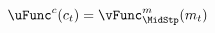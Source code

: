   \begin{equation}\begin{gathered}\begin{aligned}
        \uFunc^{c}(c_{t})  & =\vFunc^{m}_{\MidStp}(m_{t})\label{eq:Envelope}
      \end{aligned}\end{gathered}\end{equation}
